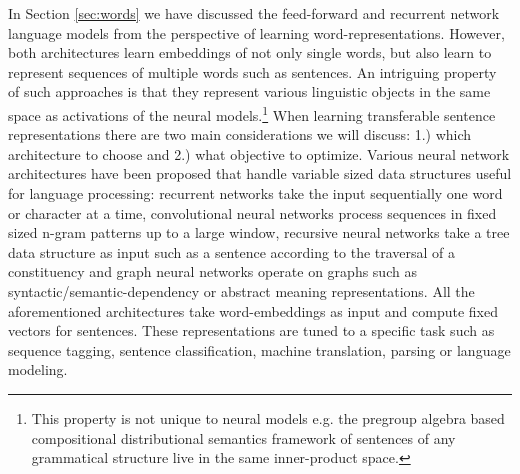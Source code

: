 In Section \ref{sec:words} we have discussed the feed-forward \citep{bengio2003neural}
and recurrent network \citep{mikolov2010recurrent} language models from the perspective
of learning word-representations. However, both architectures learn embeddings of not only single words,
but also learn to represent sequences of multiple words such as sentences.
An intriguing property of such approaches is that
they represent various linguistic objects in the same space as activations of the neural models.\footnote{This property is not unique to neural models e.g. the pregroup algebra based compositional distributional
semantics framework of \cite{coecke2010mathematical}
sentences of any grammatical structure live in the same inner-product space.}
When learning transferable
sentence representations there are two main considerations we will discuss:
1.) which architecture to choose and 2.) what objective to optimize.
Various neural network architectures have been proposed that
handle variable sized data structures useful for language processing: recurrent networks
take the input sequentially one word or character at a time,
convolutional neural networks
\citep{kalchbrenner2014convolutional,zhang2015character,conneau2016very,chen2013learning}
process sequences in fixed sized n-gram patterns up to a large window,
recursive neural networks \citep{goller1996learning,socher2011parsing,tai2015improved}
take a tree data structure as input such as a sentence according to the traversal of a
constituency and graph neural networks operate on graphs \citep{marcheggiani2017encoding} such as
syntactic/semantic-dependency or abstract meaning representations.
All the aforementioned architectures take word-embeddings as input
and compute fixed vectors for sentences.
These representations are tuned to a specific task such as sequence tagging,
sentence classification, machine translation, parsing or language modeling.


